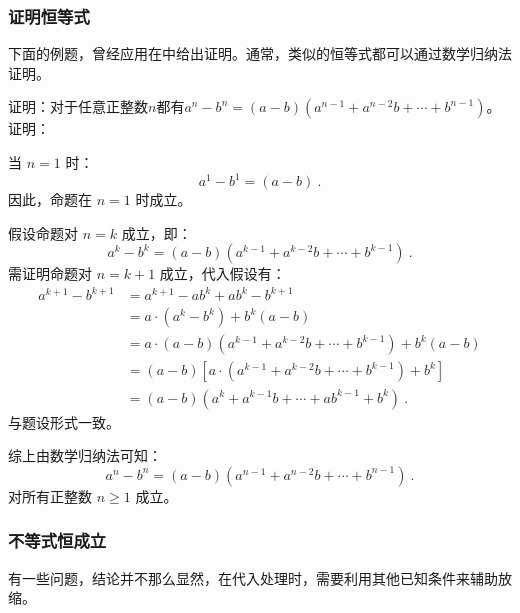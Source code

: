 \subsubsection{证明恒等式}
下面的例题，曾经应用在中给出证明。通常，类似的恒等式都可以通过数学归纳法证明。
\begin{example}{证明：对于任意正整数$n$都有$a^n-b^n=\left(a-b\right)\left(a^{n-1}+a^{n-2}b+\cdots+b^{n-1}\right)$。}
证明：

当 $n = 1$ 时：
\begin{equation}
a^1 - b^1 = (a - b)~.
\end{equation}
因此，命题在 $n = 1$ 时成立。

假设命题对 $n = k$ 成立，即：
\begin{equation}
a^k - b^k = (a - b)\left(a^{k-1} + a^{k-2}b + \cdots + b^{k-1}\right)~.
\end{equation}
需证明命题对 $n = k+1$ 成立，代入假设有：
\begin{equation}
\begin{aligned}
a^{k+1} - b^{k+1} &= a^{k+1}-ab^k+ab^k - b^{k+1}\\
&= a \cdot (a^k - b^k) + b^k(a - b)\\
&=a \cdot (a - b)\left(a^{k-1} + a^{k-2}b + \cdots + b^{k-1}\right) + b^k(a - b)\\
&=(a - b)\left[a \cdot \left(a^{k-1} + a^{k-2}b + \cdots + b^{k-1}\right) + b^k\right]\\
&=(a - b)\left(a^{k} + a^{k-1}b + \cdots + ab^{k-1} + b^k\right)~.
\end{aligned}
\end{equation}
与题设形式一致。

综上由数学归纳法可知：
\begin{equation}
a^n - b^n = (a - b)\left(a^{n-1} + a^{n-2}b + \cdots + b^{n-1}\right)~.
\end{equation}
对所有正整数 $n \geq 1$ 成立。
\end{example}

\subsubsection{不等式恒成立}

有一些问题，结论并不那么显然，在代入处理时，需要利用其他已知条件来辅助放缩。

